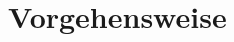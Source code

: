 \documentclass[a4paper,11pt]{article}%
\renewcommand{\\}{\vspace*{0.5\baselineskip} \newline}
\begin{document}
%
%
%
%
%
%
%

\newpage
\section{Vorgehensweise}
\end{document}
